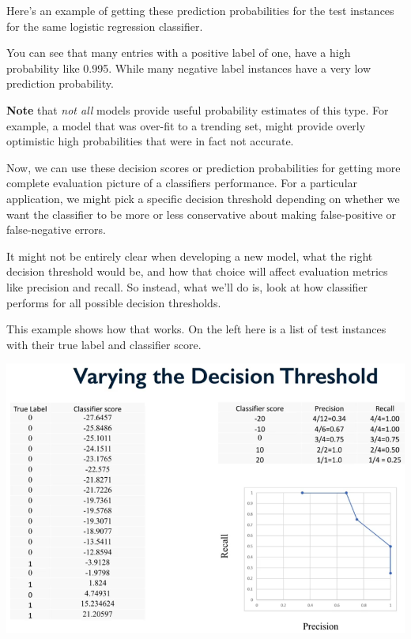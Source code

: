 \begin{multicols}{2}
Here's an example of getting these prediction probabilities for the test instances for the same logistic regression classifier. 

You can see that many entries with a positive label of one, have a high probability like 0.995. While many negative label instances have a very low prediction probability. 

\textbf{Note} that \emph{not all} models provide useful probability estimates of this type. For example, a model that was over-fit to a trending set, might provide overly optimistic high probabilities that were in fact not accurate. 

Now, we can use these decision scores or prediction probabilities for getting more complete evaluation picture of a classifiers performance. For a particular application, we might pick a specific decision threshold depending on whether we want the classifier to be more or less conservative about making false-positive or false-negative errors. 

It might not be entirely clear when developing a new model, what the right decision threshold would be, and how that choice will affect evaluation metrics like precision and recall. So instead, what we'll do is, look at how classifier performs for all possible decision thresholds. 

This example shows how that works. On the left here is a list of test instances with their true label and classifier score. 

\begin{center}
\includegraphics[width=\linewidth]{img/Varying-Decision-Threshold.png} 
\end{center}


\end{multicols}
